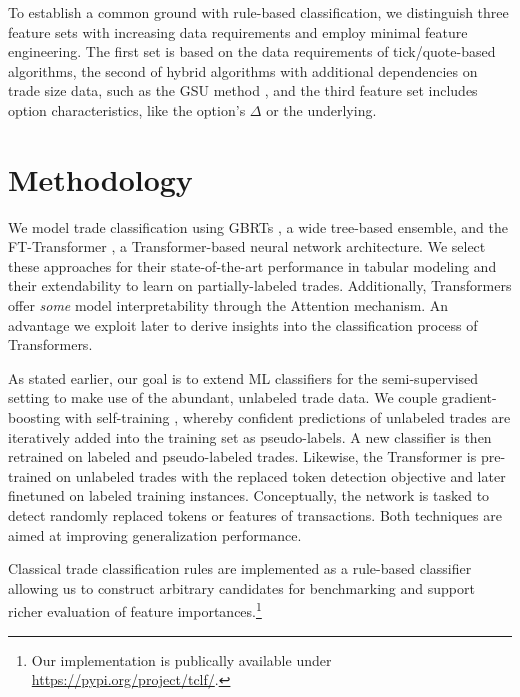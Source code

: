 To establish a common ground with rule-based classification, we distinguish three feature sets with increasing data requirements and employ minimal feature engineering. The first set is based on the data requirements of tick/quote-based algorithms, the second of hybrid algorithms with additional dependencies on trade size data, such as the \gls{GSU} method \autocite{grauerOptionTradeClassification2022}, and the third feature set includes option characteristics, like the option's $\Delta$ or the underlying. 

\section{Methodology}

We model trade classification using \glspl{GBRT} \autocites[][]{friedmanGreedyFunctionApproximation2001}, a wide tree-based ensemble, and the FT-Transformer \autocite{gorishniyRevisitingDeepLearning2021}, a Transformer-based neural network architecture. We select these approaches for their state-of-the-art performance in tabular modeling \autocites[][]{gorishniyRevisitingDeepLearning2021}[][]{grinsztajnWhyTreebasedModels2022} and their extendability to learn on partially-labeled trades. Additionally, Transformers offer \textit{some} model interpretability through the Attention mechanism. An advantage we exploit later to derive insights into the classification process of Transformers.

As stated earlier, our goal is to extend \gls{ML} classifiers for the semi-supervised setting to make use of the abundant, unlabeled trade data. We couple gradient-boosting with self-training \autocite{yarowskyUnsupervisedWordSense1995}, whereby confident predictions of unlabeled trades are iteratively added into the training set as pseudo-labels. A new classifier is then retrained on labeled and pseudo-labeled trades. Likewise, the Transformer is pre-trained on unlabeled trades with the replaced token detection objective \autocite{clarkElectraPretrainingText2020} and later finetuned on labeled training instances. Conceptually, the network is tasked to detect randomly replaced tokens or features of transactions. Both techniques are aimed at improving generalization performance.

Classical trade classification rules are implemented as a rule-based classifier allowing us to construct arbitrary candidates for benchmarking and support richer evaluation of feature importances.\footnote{Our implementation is publically available under \url{https://pypi.org/project/tclf/}.}

